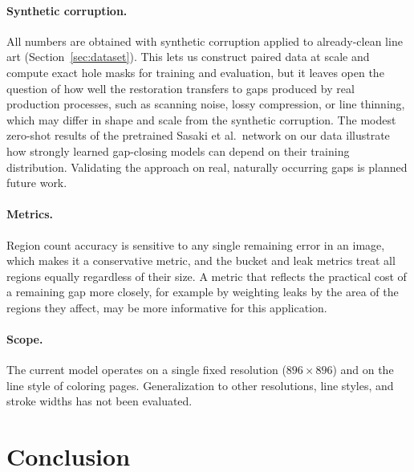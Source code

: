 \documentclass[preprint,12pt]{elsarticle}
\begin{document}
\paragraph{Synthetic corruption.} All numbers are obtained with synthetic corruption
applied to already-clean line art (Section~\ref{sec:dataset}). This lets us construct
paired data at scale and compute exact hole masks for training and evaluation, but it
leaves open the question of how well the restoration transfers to gaps produced by
real production processes, such as scanning noise, lossy compression, or line
thinning, which may differ in shape and scale from the synthetic corruption. The
modest zero-shot results of the pretrained Sasaki et al.\ network on our data
illustrate how strongly learned gap-closing models can depend on their training
distribution. Validating the approach on real, naturally occurring gaps is planned
future work.

\paragraph{Metrics.} Region count accuracy is sensitive to any single remaining
error in an image, which makes it a conservative metric, and the bucket and leak
metrics treat all regions equally regardless of their size. A metric that reflects
the practical cost of a remaining gap more closely, for example by weighting leaks by
the area of the regions they affect, may be more informative for this application.

\paragraph{Scope.} The current model operates on a single fixed resolution
($896\times 896$) and on the line style of coloring pages. Generalization to other
resolutions, line styles, and stroke widths has not been evaluated.

\section{Conclusion}
\end{document}
